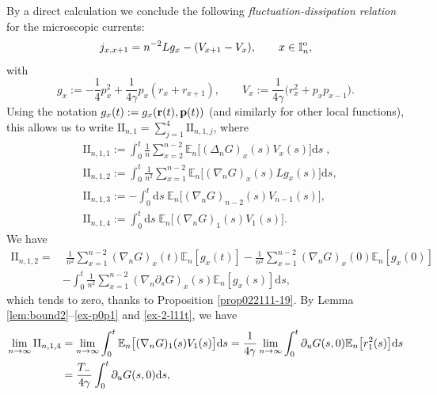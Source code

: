 \documentclass[EJP]{ejpecp} %
\newcommand\E{{\mathbb E}}
\newcommand\T{{\mathbb I}}
\newcommand \ga{\gamma}
\newcommand{\dd  }{\mathrm{d}}
\numberwithin{equation}{section}
\begin{document}
By a direct calculation we conclude the following \emph{fluctuation-dissipation relation} for the microscopic currents:
\begin{equation}
  \label{eq:fd1-n}
  j_{x,x+1} = n^{-2} L g_x - (V_{x+1}-V_x), 
\qquad x\in\T_n^{\rm o},
\end{equation}
 with
  \begin{equation} \label{eq:defg}
   g_x:=-\frac14p_x^2 + \frac{1}{4\gamma}p_x(r_x+r_{x+1}),\qquad
 V_x:= \frac 1{4 \gamma}  \big(r_x^2 +p_xp_{x-1}\big) .
\end{equation}
Using the notation $g_x(t):=g_x({\bf r}(t),{\bf p}(t))$ (and similarly for other local functions), this allows us to write $\mathrm{II}_{n,1} =\sum_{j=1}^4\mathrm{II}_{n,1,j}
$, where 
\begin{align*}
&
 \mathrm{II}_{n,1,1} := \int_0^{t}  \frac 1{n}  \sum_{x=2}^{n-2}
                                                 {\mathbb E}_n\big[  (\Delta_n G)_x (s)V_x(s) 
                                                 \big]  \dd s\;  ,\\
&\mathrm{II}_{n,1,2} :=\int_0^{t}  \frac 1{n^2}
  \sum_{x=1}^{n-2}{\mathbb E}_n \big[  (\nabla_n G)_x(s)  L g_x(s)\big] \dd s , \\
&
\mathrm{II}_{n,1,3} := -\int_0^{t} \dd s\; {\mathbb E}_n\big[  (\nabla_n G)_{n-2} (s)V_{n-1}(s) 
                                                 \big]  ,\\
&
\mathrm{II}_{n,1,4} := \int_0^{t} \dd s\; {\mathbb E}_n\big[ 
                                                   (\nabla_n G)_1(s)V_1(s)\big] .
\end{align*}
We have
\begin{align*}
\mathrm{II}_{n,1,2}= & \;  \frac 1{n^2} \sum_{x=1}^{n-2}  (\nabla_n G)_x(t)
  \mathbb E_n\left[ g_x(t)\right]-\frac 1{n^2} \sum_{x=1}^{n-2}
  (\nabla_n G)_x(0) \mathbb E_n\left[ g_x(0)\right]\\
&
-\int_0^{t}\frac 1{n^2} \sum_{x=1}^{n-2} (\nabla_n \partial_sG)_x(s) \mathbb E_n \left[ g_x(s)\right]\dd s,
  \end{align*}
which {tends to zero}, thanks to Proposition \ref{prop022111-19}.
By Lemma \ref{lem:bound2}--\eqref{ex-p0p1} and \eqref{ex-2-l11t}, we have
\begin{align}
  \label{eq:6}
    \lim_{n\to\infty}  \mathrm{II}_{n,1,4}&=\lim_{n\to\infty}   \int_0^t {\mathbb E}_n\big[ (\nabla_n G)_1(s) V_1(s) \big] \dd s
    =\frac{1}{4\ga} \lim_{n\to\infty}  \int_0^t  \partial_u
      G(s,0)\E_n\big[r_1^2(s)\big] \dd s\notag\\
&
=\frac{T_-}{4\ga} \int_0^t  \partial_u G(s,0) \dd s,
\end{align}
\end{document}
